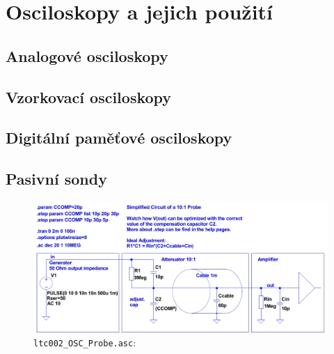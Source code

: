 \setchaptertoc
\chapter{Osciloskopy a jejich použití}

  \section{Analogové osciloskopy}
  \section{Vzorkovací osciloskopy}
  \section{Digitální paměťové osciloskopy}
   

  \section{Pasivní sondy}

    \begin{figure}[ht!]
      \centering
      \includegraphics[width=1\linewidth]{../ltspice/ltc003_OSC_Probe_simple.pdf}
      \caption{\texttt{ltc002\_OSC\_Probe.asc}: }
      \label{SPICE:fig_ltc003_OSC}
    \end{figure}
    
